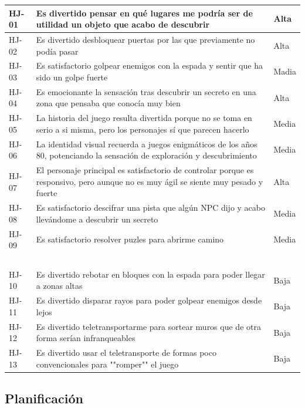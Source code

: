 \begin{table}[H]
\begin{tabular}{|l|p{13cm}|l|}
        HJ-01 & Es divertido pensar en qué lugares me podría ser de utilidad un objeto que acabo de descubrir & Alta \\ \hline
        HJ-02 & Es divertido desbloquear puertas por las que previamente no podía pasar & Alta \\ \hline
        HJ-03 & Es satisfactorio golpear enemigos con la espada y sentir que ha sido un golpe fuerte & Madia \\ \hline
        HJ-04 & Es emocionante la sensación tras descubrir un secreto en una zona que pensaba que conocía muy bien & Alta \\ \hline
        HJ-05 & La historia del juego resulta divertida porque no se toma en serio a si misma, pero los personajes sí que parecen hacerlo & Media \\ \hline
        HJ-06 & La identidad visual recuerda a juegos enigmáticos de los años 80, potenciando la sensación de exploración y descubrimiento & Media \\ \hline
        HJ-07 & El personaje principal es satisfactorio de controlar porque es responsivo, pero aunque no es muy ágil se siente muy pesado y fuerte & Alta \\ \hline
        HJ-08 & Es satisfactorio descifrar una pista que algún NPC dijo y acabo llevándome a descubrir un secreto & Media \\ \hline
        HJ-09 & Es satisfactorio resolver puzles para abrirme camino & Media \\ \hline
        ~ & ~ & ~ \\ \hline
        HJ-10 & Es divertido rebotar en bloques con la espada para poder llegar a zonas altas & Baja \\ \hline
        HJ-11 & Es divertido disparar rayos para poder golpear enemigos desde lejos & Baja \\ \hline
        HJ-12 & Es divertido teletransportarme para sortear muros que de otra forma serían infranqueables & Baja \\ \hline
        HJ-13 & Es divertido usar el teletransporte de formas poco convencionales para ""romper"" el juego & Baja \\ \hline
    \end{tabular}
\end{table}

\subsection{Planificación}

